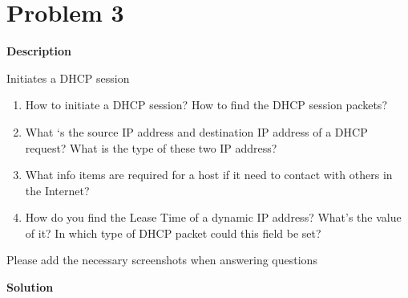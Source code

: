 \documentclass[12pt,letterpaper]{ctexart}
\begin{document}
\newpage


\section*{Problem 3}

{\bf Description}

Initiates a DHCP session

\begin{enumerate}
  \item How to initiate a DHCP session? How to find the DHCP session packets?
  \item What ‘s the source IP address and destination IP address of a DHCP request? What is the type of these two IP address?
  \item What info items are required for a host if it need to contact with others in the Internet?
  \item How do you find the Lease Time of a dynamic IP address? What’s the value of it? In which type of DHCP packet could this field be set?
\end{enumerate}

Please add the necessary screenshots when answering questions


{\bf Solution}
\end{document}
